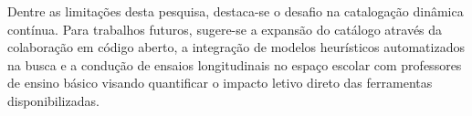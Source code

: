 \documentclass[12pt, a4paper, oneside]{article}
\begin{document}
Dentre as limitações desta pesquisa, destaca-se %
o desafio na catalogação dinâmica contínua. Para trabalhos futuros, sugere-se a expansão do catálogo através da colaboração em código aberto, a integração de modelos heurísticos automatizados na busca e a condução de ensaios longitudinais no espaço escolar com professores de ensino básico visando quantificar o impacto letivo direto das ferramentas disponibilizadas.
\end{document}
